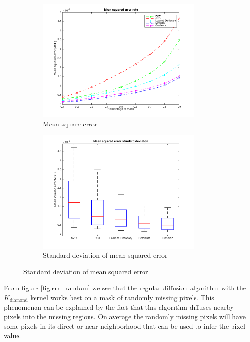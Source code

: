 \begin{figure}
	\begin{subfigure}[b]{0.48\textwidth}
		\centering
		\includegraphics[trim=1.4cm 0.5cm 1.5cm 0.5cm, clip, width=0.9\textwidth]{figures/mse}
		\caption{Mean square error }
		\label{fig:mse}
	\end{subfigure}
	\begin{subfigure}[b]{0.48\textwidth}
		\centering
		\includegraphics[trim=1.4cm 0.5cm 1.5cm 0.5cm, clip, width=0.9\textwidth]{figures/mse_std}
		\caption{Standard deviation of mean squared error}
		\label{fig:mse_std}	
	\end{subfigure}
\end{figure}

From figure \ref{fig:err_random} we see that the regular diffusion algorithm with the $K_{\text{diamond}}$ kernel works best on a mask of randomly missing pixels. This phenomenon can be explained by the fact that this algorithm diffuses nearby pixels into the missing regions. On average the randomly missing pixels will have some pixels in its direct or near neighborhood that can be used to infer the pixel value.

